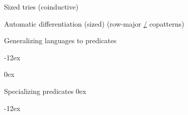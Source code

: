 \documentclass[aspectratio=169]{beamer}
\begin{document}
\rnc{}

\begin{frame}{Sized tries \hfill (coinductive)}
\vspace{-1.5ex}
\vspace{2ex}
\end{frame}

\begin{frame}{Automatic differentiation (sized) \hfill (row-major \hyperlink{automatic-diff}{/} copatterns)}
\vspace{-1.75ex}
\end{frame}


\rnc{}

\begin{comment}
\begin{frame}{Two kinds of language operations}
Codomain transformations: \AF{∅}, \AF 𝒰, \AF{\_∪\_}, \AF{\_∩\_}

Domain transformations: \AF{𝟏}, \AF{\_⋆\_}, \AF{\_✪}, \AF{`}
\end{frame}
\end{comment}

\begin{frame}{Generalizing languages to predicates}
\vspace{-1ex}
\begin{center}
\mathindent-12ex
\end{center}
\vspace{-2ex}
\hfill
\mathindent0ex
\small
\begin{minipage}[b]{20em}
\end{minipage}
\hfill
\begin{minipage}[b]{20em}
\end{minipage}
\hfill\;
\end{frame}

\begin{frame}{Specializing predicates}
\vspace{2ex}
\mathindent0ex
\begin{center}
\mathindent-12ex
\end{center}
\vspace{-2ex}
\hfill
\begin{minipage}[c]{11em}
\end{minipage}
\hfill
\begin{minipage}[c]{15em}
\end{minipage}
\hfill\;
\end{frame}
\end{document}
